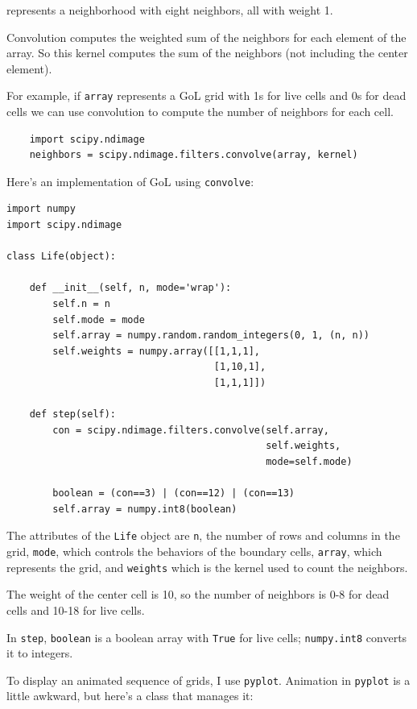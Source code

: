 \documentclass[10pt]{book}
\begin{document}
represents a neighborhood with eight neighbors, all with weight 1.

Convolution computes the weighted sum of the neighbors for each
element of the array.  So this kernel computes the sum of the
neighbors (not including the center element).  

For example, if {\tt array} represents a GoL grid with 1s for live
cells and 0s for dead cells we can use convolution to compute the
number of neighbors for each cell.

\begin{verbatim}
    import scipy.ndimage
    neighbors = scipy.ndimage.filters.convolve(array, kernel) 
\end{verbatim}

Here's an implementation of GoL using {\tt convolve}:

\begin{verbatim}
import numpy
import scipy.ndimage

class Life(object):

    def __init__(self, n, mode='wrap'):
        self.n = n
        self.mode = mode
        self.array = numpy.random.random_integers(0, 1, (n, n))
        self.weights = numpy.array([[1,1,1],
                                    [1,10,1],
                                    [1,1,1]])

    def step(self):
        con = scipy.ndimage.filters.convolve(self.array, 
                                             self.weights,
                                             mode=self.mode)

        boolean = (con==3) | (con==12) | (con==13)
        self.array = numpy.int8(boolean)
\end{verbatim}

The attributes of the {\tt Life} object are {\tt n}, the number
of rows and columns in the grid, {\tt mode}, which controls the
behaviors of the boundary cells, {\tt array}, which represents
the grid, and {\tt weights} which is the kernel used to count
the neighbors.

The weight of the center cell is 10, so the number of neighbors
is 0-8 for dead cells and 10-18 for live cells.

In {\tt step}, {\tt boolean} is a boolean array with {\tt True}
for live cells;  {\tt numpy.int8} converts it to integers.

To display an animated sequence of grids, I use {\tt pyplot}.
Animation in {\tt pyplot} is a little awkward, but here's a class
that manages it:
\end{document}

